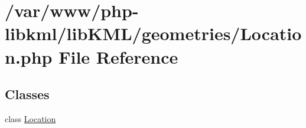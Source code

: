 \hypertarget{Location_8php}{
\section{/var/www/php-\/libkml/libKML/geometries/Location.php File Reference}
\label{d8/db6/Location_8php}
}
\subsection*{Classes}
\begin{DoxyCompactItemize}
\item 
class \hyperlink{classLocation}{Location}
\end{DoxyCompactItemize}
